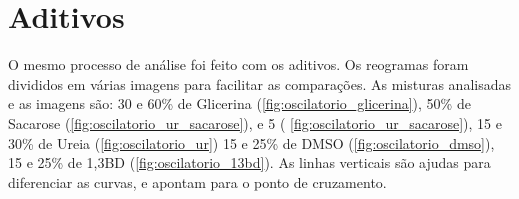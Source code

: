 	\FloatBarrier
	
	\section{Aditivos}
	
	O mesmo processo de análise foi feito com os aditivos. Os reogramas foram divididos em várias imagens para facilitar as comparações. As misturas analisadas e as imagens são: 30 e 60\% de Glicerina (\autoref{fig:oscilatorio_glicerina}), 50\% de Sacarose (\autoref{fig:oscilatorio_ur_sacarose}), e 5 ( \autoref{fig:oscilatorio_ur_sacarose}), 15 e 30\% de Ureia (\autoref{fig:oscilatorio_ur}) 15 e 25\% de DMSO (\autoref{fig:oscilatorio_dmso}), 15 e 25\% de 1,3BD (\autoref{fig:oscilatorio_13bd}). As linhas verticais são ajudas para diferenciar as curvas, e apontam para o ponto de cruzamento.
	

